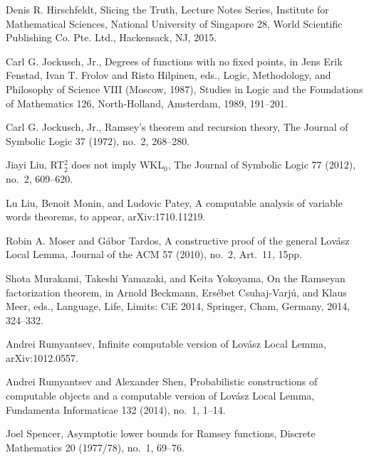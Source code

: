 \documentclass{amsart}
\theoremstyle{definition}
\begin{document}
\begin{thebibliography}{99}
 Denis R. Hirschfeldt, Slicing the Truth, Lecture Notes
Series, Institute for Mathematical Sciences, National University of
Singapore 28, World Scientific Publishing Co. Pte. Ltd., Hackensack,
NJ, 2015.

 Carl G. Jockusch, Jr., Degrees of functions with no
fixed points, in Jens Erik Fenstad, Ivan T. Frolov and Risto Hilpinen,
eds., Logic, Methodology, and Philosophy of Science VIII
(Moscow, 1987), Studies in Logic and the Foundations of Mathematics 126,
North-Holland, Amsterdam, 1989, 191--201.

 Carl G. Jockusch, Jr., Ramsey's theorem and recursion
theory, The Journal of Symbolic Logic 37 (1972), no.\ 2, 268--280.

 Jiayi Liu, RT$^2_2$ does not imply WKL$_0$, The Journal
of Symbolic Logic 77 (2012), no.\ 2, 609--620.

 Lu Liu, Benoit Monin, and Ludovic Patey, A computable
analysis of variable words theorems, to appear, arXiv:1710.11219.

 Robin A. Moser and G{\' a}bor Tardos, A constructive
proof of the general Lov{\' a}sz Local Lemma, Journal of the ACM 57
(2010), no.\ 2, Art.\ 11, 15pp.

 Shota Murakami, Takeshi Yamazaki, and Keita Yokoyama, On
the Ramseyan factorization theorem, in Arnold Beckmann, Ers\'ebet
Csuhaj-Varj\'u, and Klaus Meer, eds., Language, Life, Limits: CiE
2014, Springer, Cham, Germany, 2014, 324--332.

 Andrei Rumyantsev, Infinite computable version of Lov\'asz
Local Lemma, arXiv:1012.0557.

 Andrei Rumyantsev and Alexander Shen, Probabilistic
constructions of computable objects and a computable version of
Lov\'asz Local Lemma, Fundamenta Informaticae 132 (2014), no.\ 1,
1--14.

 Joel Spencer, Asymptotic lower bounds for Ramsey
functions, Discrete Mathematics 20 (1977/78), no.\ 1, 69--76.

\end{thebibliography}
\end{document}
